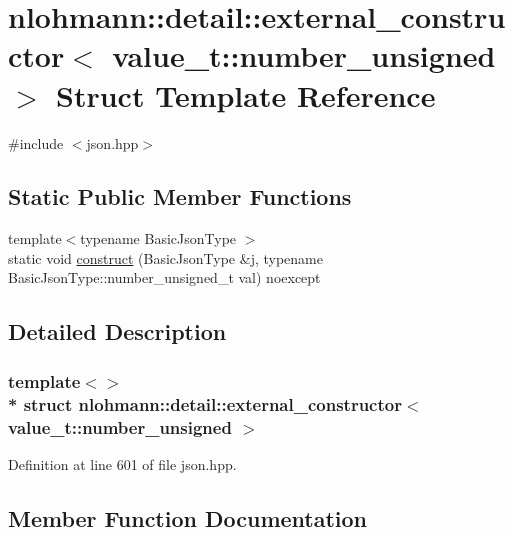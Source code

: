 \hypertarget{structnlohmann_1_1detail_1_1external__constructor_3_01value__t_1_1number__unsigned_01_4}{}\section{nlohmann\+:\+:detail\+:\+:external\+\_\+constructor$<$ value\+\_\+t\+:\+:number\+\_\+unsigned $>$ Struct Template Reference}
\label{structnlohmann_1_1detail_1_1external__constructor_3_01value__t_1_1number__unsigned_01_4}


{\ttfamily \#include $<$json.\+hpp$>$}

\subsection*{Static Public Member Functions}
\begin{DoxyCompactItemize}
\item 
{\footnotesize template$<$typename Basic\+Json\+Type $>$ }\\static void \hyperlink{structnlohmann_1_1detail_1_1external__constructor_3_01value__t_1_1number__unsigned_01_4_a17969b14852f43e04353858c87b0f539}{construct} (Basic\+Json\+Type \&j, typename Basic\+Json\+Type\+::number\+\_\+unsigned\+\_\+t val) noexcept
\end{DoxyCompactItemize}


\subsection{Detailed Description}
\subsubsection*{template$<$$>$\\*
struct nlohmann\+::detail\+::external\+\_\+constructor$<$ value\+\_\+t\+::number\+\_\+unsigned $>$}



Definition at line 601 of file json.\+hpp.



\subsection{Member Function Documentation}
